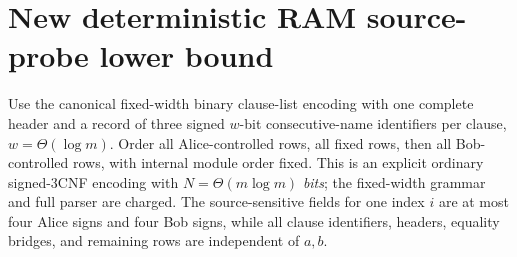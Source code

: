 \documentclass[11pt]{article}
\begin{document}
\section{New deterministic RAM source-probe lower bound}
Use the canonical fixed-width binary clause-list encoding with one complete header and a record of three signed $w$-bit consecutive-name identifiers per clause, $w=\Theta(\log m)$. Order all Alice-controlled rows, all fixed rows, then all Bob-controlled rows, with internal module order fixed. This is an explicit ordinary signed-3CNF encoding with $N=\Theta(m\log m)$ \emph{bits}; the fixed-width grammar and full parser are charged. The source-sensitive fields for one index $i$ are at most four Alice signs and four Bob signs, while all clause identifiers, headers, equality bridges, and remaining rows are independent of $a,b$.
\end{document}
